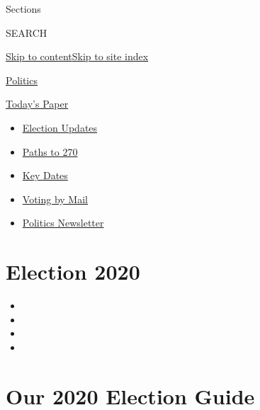Sections

SEARCH

\protect\hyperlink{site-content}{Skip to
content}\protect\hyperlink{site-index}{Skip to site index}

\href{https://www.nytimes3xbfgragh.onion/section/politics}{Politics}

\href{https://myaccount.nytimes3xbfgragh.onion/auth/login?response_type=cookie\&client_id=vi}{}

\href{https://www.nytimes3xbfgragh.onion/section/todayspaper}{Today's
Paper}

\begin{itemize}
\item
  \href{https://www.nytimes3xbfgragh.onion/live/2020/09/11/us/trump-vs-biden?action=click\&pgtype=Article\&state=default\&region=TOP_BANNER\&context=storylines_menu}{Election
  Updates}
\item
  \href{https://www.nytimes3xbfgragh.onion/interactive/2020/us/elections/election-states-biden-trump.html?action=click\&pgtype=Article\&state=default\&region=TOP_BANNER\&context=storylines_menu}{Paths
  to 270}
\item
  \href{https://www.nytimes3xbfgragh.onion/interactive/2019/us/elections/2020-presidential-election-calendar.html?action=click\&pgtype=Article\&state=default\&region=TOP_BANNER\&context=storylines_menu}{Key
  Dates}
\item
  \href{https://www.nytimes3xbfgragh.onion/interactive/2020/08/31/us/politics/vote-by-mail-deadlines.html?action=click\&pgtype=Article\&state=default\&region=TOP_BANNER\&context=storylines_menu}{Voting
  by Mail}
\item
  \href{https://www.nytimes3xbfgragh.onion/newsletters/politics?action=click\&pgtype=Article\&state=default\&region=TOP_BANNER\&context=storylines_menu}{Politics
  Newsletter}
\end{itemize}

\hypertarget{election-2020}{%
\section{Election 2020}\label{election-2020}}

\begin{itemize}
\item
\item
\item
\item
\end{itemize}

\hypertarget{our-2020-election-guide}{%
\section{Our 2020 Election Guide}\label{our-2020-election-guide}}

